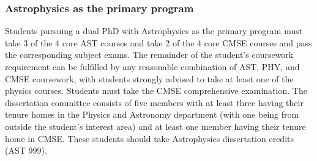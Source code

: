 \subsubsection{Astrophysics as the primary program}

Students pursuing a dual PhD with Astrophysics as the primary program
must take 3 of the 4 core AST courses and take 2 of the 4 core CMSE
courses and pass the corresponding subject exams.  The remainder of
the student's coursework requirement can be fulfilled by any
reasonable combination of AST, PHY, and CMSE coursework, with students
strongly advised to take at least one of the physics courses.
Students must take the CMSE comprehensive examination.  The
dissertation committee consists of five members with at least three
having their tenure homes in the Physics and Astronomy department
(with one being from outside the student's interest area) and at least
one member having their tenure home in CMSE.  These students should
take Astrophysics dissertation credits (AST 999).

